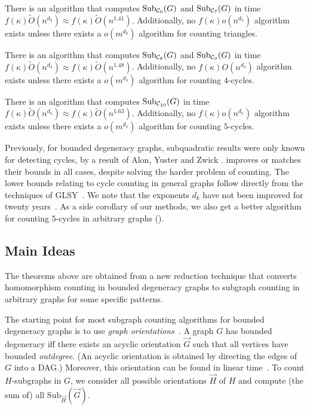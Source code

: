 \documentclass[a4paper,UKenglish,cleveref, autoref, numberwithinsect, thm-restate]{lipics-v2021}
\newcommand{\cycle}[1]{\cC_{#1}}
\newcommand{\Sub}[2]{\mathrm{Sub}_{#2}(#1)}
\newcommand{\degen}{\kappa}
\newcommand{\cC}{{\cal C}}
\begin{document}
	\begin{theorem} \label{thm:cycles}


		\begin{asparaitem}
			\item There is an algorithm that computes $\Sub{G}{\cycle{6}}$ and $\Sub{G}{\cycle{7}}$ in time $f(\degen)\tilde{O}(n^{d_3}) \approx f(\degen)\tilde{O}(n^{1.41})$. Additionally, no $f(\degen)o(n^{d_3})$ algorithm exists unless there exists a $o(m^{d_3})$ algorithm for counting triangles.
			\item There is an algorithm that computes $\Sub{G}{\cycle{8}}$ and $\Sub{G}{\cycle{9}}$ in time $f(\degen)\tilde{O}(n^{d_4}) \approx f(\degen)\tilde{O}(n^{1.48})$. Additionally, no $f(\degen)O(n^{d_4})$ algorithm exists unless there exists a $o(m^{d_4})$ algorithm for counting $4$-cycles.
			\item There is an algorithm that computes $\Sub{G}{\cycle{10}}$ in time $f(\degen)\tilde{O}(n^{d_5}) \approx f(\degen)\tilde{O}(n^{1.63})$. Additionally, no $f(\degen)o(n^{d_5})$ algorithm exists unless there exists a $o(m^{d_5})$ algorithm for counting $5$-cycles.
		\end{asparaitem}
	\end{theorem}

	Previously, for bounded degeneracy graphs, subquadratic results were only known
    for detecting cycles, by a result of Alon, Yuster and Zwick \cite{AlYuZw97}.  improves or matches their bounds in all cases, despite solving the harder problem of counting. 
    The lower bounds relating to cycle counting in general graphs follow directly from the techniques of GLSY~\cite{GiLeSh+23}.
    We note that the exponents $d_k$ have not been improved for twenty years~\cite{AlYuZw97, YuZw04}.
    As a side corollary of our methods, we also get a better algorithm for counting $5$-cycles in arbitrary graphs ().

	
	\subsection{Main Ideas} \label{sec:ideas}
	
	The theorems above are obtained from a new reduction technique that converts
	homomorphism counting in bounded degeneracy graphs to subgraph counting in 
	arbitrary graphs for some specific patterns.

The starting point for most subgraph counting algorithms for bounded degeneracy graphs
	is to use \emph{graph orientations}~\cite{Se23}. A graph $G$ has bounded degeneracy iff
	there exists an acyclic orientation $\vec{G}$ such that all vertices have bounded \emph{outdegree}.
	(An acyclic orientation is obtained by directing the edges of $G$ into a DAG.)
	Moreover, this orientation can be found in linear time~\cite{MaBe83}. To count $H$-subgraphs
	in $G$, we consider all possible orientations $\vec{H}$ of $H$ and compute
	(the sum of) all $\Sub{\vec{G}}{\vec{H}}$.
	
\end{document}
